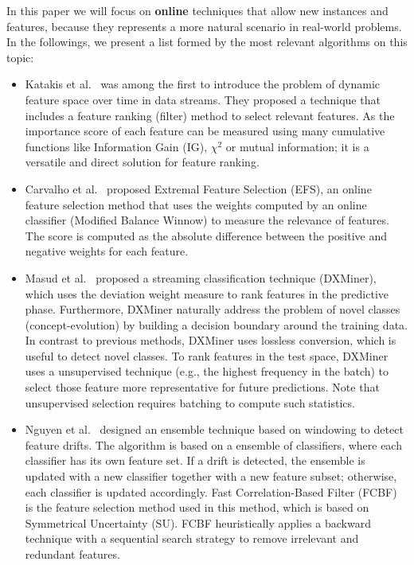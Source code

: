 \documentclass[preprint,12pt]{elsarticle}
\begin{document}
In this paper we will focus on \textbf{online} techniques that allow new instances and features, because they represents a more natural scenario in real-world problems. In the followings, we present a list formed by the most relevant algorithms on this topic:

\begin{itemize}
	\item Katakis et al.~\cite{kata05} was among the first to introduce the problem of dynamic feature space over time in data streams. They proposed a technique that includes a feature ranking (filter) method to select relevant features. As the importance score of each feature can be measured using many cumulative functions like Information Gain (IG), $\chi^2$ or mutual information; it is a versatile and direct solution for feature ranking.
	\item Carvalho et al.~\cite{carva06} proposed Extremal Feature Selection (EFS), an online feature selection method that uses the weights computed by an online classifier (Modified Balance Winnow) to measure the relevance of features. The score is computed as the absolute difference between the positive and negative weights for each feature.
	\item Masud et al.~\cite{masud10} proposed a streaming classification technique (DXMiner), which uses the deviation weight measure to rank features in the predictive phase. Furthermore, DXMiner naturally address the problem of novel classes (concept-evolution) by building a decision boundary around the training data. In contrast to previous methods, DXMiner uses lossless conversion, which is useful to detect novel classes. To rank features in the test space, DXMiner uses a unsupervised technique (e.g., the highest frequency in the batch) to select those feature more representative for future predictions. Note that unsupervised selection requires batching to compute such statistics.
	\item Nguyen et al.~\cite{nguyen12} designed an ensemble technique based on windowing to detect feature drifts. The algorithm is based on a ensemble of classifiers, where each classifier has its own feature set. If a drift is detected, the ensemble is updated with a new classifier together with a new feature subset; otherwise, each classifier is updated accordingly. Fast Correlation-Based Filter (FCBF) is the feature selection method used in this method, which is based on Symmetrical Uncertainty (SU). FCBF heuristically applies a backward technique with a sequential search strategy to remove irrelevant and redundant features.

\end{itemize}
\end{document}

